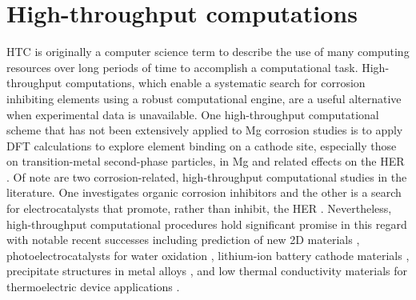 \section{High-throughput computations}
\ac{HTC} is originally a computer science term to describe the use of many computing resources over long periods of time to accomplish a computational task.
High-throughput computations, which enable a systematic search for corrosion inhibiting elements using a robust computational engine, are a useful alternative when experimental data is unavailable. One high-throughput computational scheme that has not been extensively applied to Mg corrosion studies is to apply \ac{DFT} calculations to explore element binding on a cathode site, especially those on transition-metal second-phase particles, in Mg and related effects on the \ac{HER} \cite{zhang2019first}. Of note are two corrosion-related, high-throughput computational studies in the literature. One investigates organic corrosion inhibitors \cite{winkler2017predicting} and the other is a search for electrocatalysts that promote, rather than inhibit, the \ac{HER} \cite{greeley2006computational}. Nevertheless, high-throughput computational procedures hold significant promise in this regard with notable recent successes including prediction of new 2D materials \cite{choudhary2017high}, photoelectrocatalysts for water oxidation \cite{yan2017solar}, lithium-ion battery cathode materials \cite{tanaka2016toward,lu2017data}, precipitate structures in metal alloys \cite{saal2013materials}, and low thermal conductivity materials for thermoelectric device applications \cite{tanaka2016toward,seko2015prediction}.